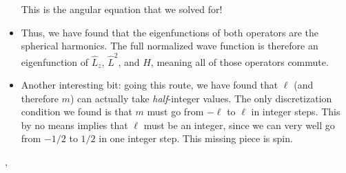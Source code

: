 \begin{itemize}
        This is the angular equation that we solved for!
    \item Thus, we have found that the eigenfunctions of both operators are the spherical harmonics. The full normalized wave function is therefore an eigenfunction of $\hat{L}_z$, $\hat{L}^2$, and $H$, meaning all of those operators commute.
    \item Another interesting bit: going this route, we have found that $\ell$ (and therefore $m$) can actually take \textit{half}-integer values. The only discretization condition we found is that $m$ must go from $-\ell$ to $\ell$ in integer steps. This by no means implies that $\ell$ must be an integer, since we can very well go from $-1/2$ to $1/2$ in one integer step. This missing piece is spin.
\end{itemize}


\sep


